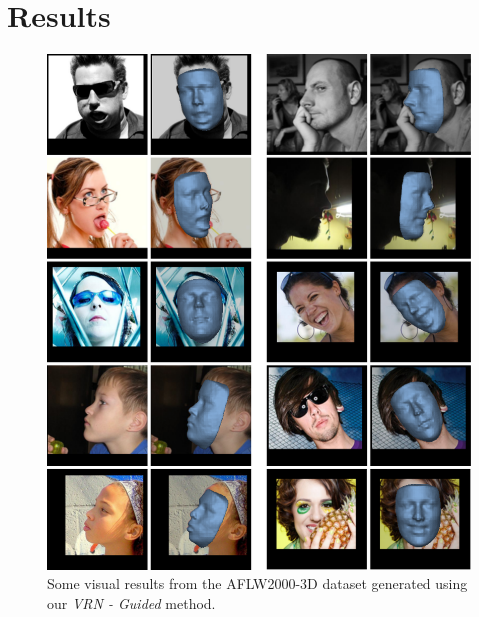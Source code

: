 

\section{Results} \label{S:Results}

\begin{figure}
\centering
\includegraphics[width=\linewidth]{img/aflw2000res.pdf}
\caption{Some visual results from the AFLW2000-3D dataset generated using our \textit{VRN - Guided} method.}
\label{fig:aflw2000res}
\vspace{-4mm}
\end{figure}

